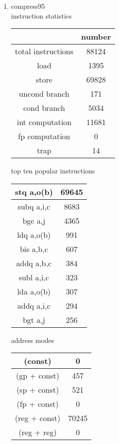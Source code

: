 \documentclass[12pt]{article}
\begin{document}
\begin{enumerate}
		\item 
		compress95\\
		instruction statistics\\
		
		\begin{tabular}{|c|c|}
		\hline
			 & number\\
		\hline
		total instructions & 88124 \\
		\hline
load         &      1395 \\ \hline
store         &     69828  \\\hline
uncond branch  &    171  \\\hline
cond branch     &   5034  \\\hline
int computation  & 11681  \\\hline
fp computation    &   0  \\\hline
trap               &   14   \\\hline
		
		\end{tabular}		
		
		\newpage
		top ten popular instructions\\
		\begin{tabular}{|c|c|}
		\hline
		stq      a,o(b)  &  69645 \\ 
 		\hline
		subq     a,i,c  &  8683 \\ 
 		\hline
		bge      a,j  &  4365 \\ 
 		\hline
		ldq      a,o(b)  &  991 \\ 
 		\hline
		bis      a,b,c  &  607 \\ 
 		\hline
		addq     a,b,c  &  384 \\ 
 		\hline
		subl     a,i,c  &  323 \\ 
 		\hline
		lda      a,o(b)  &  307 \\ 
 		\hline
		addq     a,i,c  &  294 \\ 
 		\hline
		bgt      a,j  &  256 \\ 
 		\hline
		\end{tabular}


		address modes\\
		\begin{tabular}{|c|c|}
		\hline
		(const)          &         0  \\ \hline
		(gp + const)      &   457   \\ \hline
		(sp + const)      &  521  \\ \hline
		(fp + const)      &   0   \\ \hline
		(reg + const)     &  70245   \\ \hline
		(reg + reg)       &        0   \\
 		\hline
		\end{tabular}
		

\end{enumerate}
\end{document}
